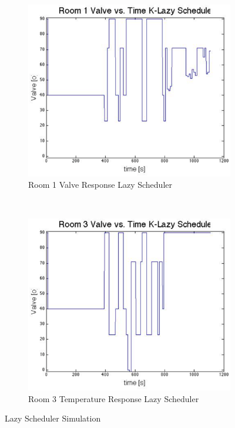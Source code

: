 \documentclass[a4paper,10pt,twocolumn]{article}
\begin{document}
\begin{figure}[t]
	\centering
        \begin{subfigure}[b]{\linewidth}
                \centering
                \includegraphics[width=\linewidth]{k_lazy_rm1_valve}
                \caption{Room 1 Valve Response Lazy Scheduler}
                \label{k_lazy_rm1_valve}
        \end{subfigure}
	\\
        \begin{subfigure}[b]{\linewidth}
                \centering
                \includegraphics[width=\linewidth]{k_lazy_rm3_valve}
                \caption{Room 3 Temperature Response Lazy Scheduler}
                \label{k_lazy_rm3_valve}
        \end{subfigure}
        \caption{Lazy Scheduler Simulation}\label{lazy_sim_valve}
\end{figure}
\end{document}
